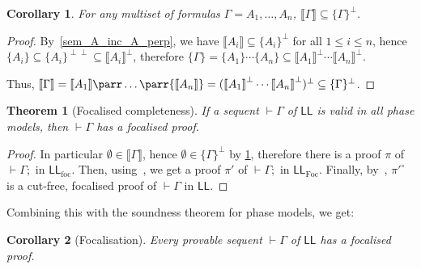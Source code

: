 \documentclass[11pt]{article}
\newtheorem{theorem}{Theorem}
\newtheorem{corollary}{Corollary}[theorem]
\newcommand\LL{\textsf{LL}}
\newcommand\LLfoc{{\LL_\text{foc}}}
\newcommand\LLFoc{{\LL_\text{Foc}}}
\newcommand\sem[1]{{\llbracket #1 \rrbracket}}
\newcommand\biperp{{\perp\perp}}
\begin{document}
\begin{corollary}
    \label{sem_Gamma_inc_Gamma_perp}
    For any multiset of formulas $\Gamma = A_1, \dots, A_n$, $\sem{\Gamma} \subseteq \{\Gamma\}^\perp$.
\end{corollary}
\begin{proof}
    By~\cref{sem_A_inc_A_perp}, we have $\sem{A_i} \subseteq \{A_i\}^\perp$ for all $1 \le i \le n$, hence $\{A_i\} \subseteq \{A_i\}^\biperp \subseteq \sem{A_i}^\perp$, therefore $\{\Gamma\} = \{A_1\} \cdots \{A_n\} \subseteq \sem{A_1}^\perp \cdots \sem{A_n}^\perp$.

    Thus, $\sem{\Gamma} = \sem{A_1} \parr \dots \parr \sem{A_n} = (\sem{A_1}^\perp \cdots \sem{A_n}^\perp)^\perp \subseteq \{\Gamma\}^\perp$.
\end{proof}

\begin{theorem}[Focalised completeness]
    If a sequent $\vdash \Gamma$ of $\LL$ is valid in all phase models, then $\vdash \Gamma$ has a focalised proof.
\end{theorem}
\begin{proof}
    In particular $\emptyset \in \sem{\Gamma}$, hence $\emptyset \in \{\Gamma\}^\perp$ by \cref{sem_Gamma_inc_Gamma_perp}, therefore there is a proof $\pi$ of $\vdash \Gamma;$ in $\LLfoc$. Then, using~\cite[section 3.2]{laurent}, we get a proof $\pi'$ of $\vdash \Gamma;$ in $\LLFoc$. Finally, by~\cite[proposition 2]{laurent}, $\pi'^\circ$ is a cut-free, focalised proof of $\vdash \Gamma$ in $\LL$.
\end{proof}

Combining this with the soundness theorem for phase models, we get:
\begin{corollary}[Focalisation]
    Every provable sequent $\vdash \Gamma$ of $\LL$ has a focalised proof.
\end{corollary}

\printbibliography
\end{document}
